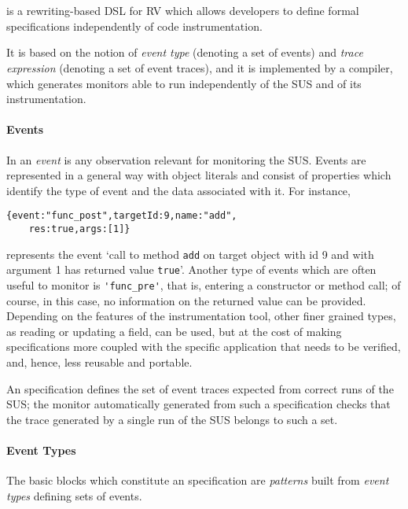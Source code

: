 \section{\rml}
\label{sec:rml}
\rml\cite{RML2021} is a rewriting-based DSL for RV which allows developers to define formal specifications independently of code instrumentation.

It  is based on the notion of \emph{event type} (denoting a set of events) and \emph{trace expression} (denoting a set of event traces),
and it is implemented by a compiler, which generates monitors able to run independently of the SUS and of its instrumentation. 

\paragraph{Events}
In \rml an \emph{event} is any observation relevant for monitoring the SUS.
Events are represented in a general way with object literals and
consist of properties which identify the type of event and the data associated with it. For instance,

\begin{lstlisting}
{event:"func_post",targetId:9,name:"add",
    res:true,args:[1]}
\end{lstlisting}          
represents the event
`call to method \lstinline{add} on target object with id 9 and with argument 1  has returned value \lstinline{true}'.
Another type of events which are often useful to monitor is \lstinline{'func_pre'}, that is, entering a constructor or method call; of course, in this
case, no information on the returned value can be provided. Depending on the features of the instrumentation tool, other finer grained types,
as reading or updating a field, can be used, but at the cost of making specifications more coupled with the specific application that needs to be
verified, and, hence, less reusable and portable.

An \rml specification defines the set of event traces expected from correct runs of the SUS; the monitor automatically generated from
such a specification checks that the trace generated by a single run of the SUS belongs to such a set.

\paragraph{Event Types}
The basic blocks which constitute an \rml specification are \emph{patterns} built from
\emph{event types} defining sets of events.

